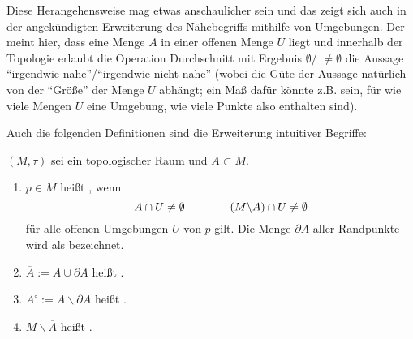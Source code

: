 \documentclass[../H_Analysis_main.tex]{subfiles}
\begin{document}
Diese Herangehensweise mag etwas anschaulicher sein und das zeigt sich auch in der angekündigten Erweiterung des Nähebegriffs mithilfe von Umgebungen. Der meint hier, dass eine Menge $A$ in einer offenen Menge $U$ liegt und innerhalb der Topologie erlaubt die Operation Durchschnitt mit Ergebnis $\emptyset$/ $\neq \emptyset$ die Aussage \enquote{irgendwie nahe}/\enquote{irgendwie nicht nahe} (wobei die Güte der Aussage natürlich von der \enquote{Größe} der Menge $U$ abhängt; ein Maß dafür könnte z.B. sein, für wie viele Mengen $U$ eine Umgebung, wie viele Punkte also enthalten sind).

Auch die folgenden Definitionen sind die Erweiterung intuitiver Begriffe:
\begin{defi}
$(M, \tau)$ sei ein topologischer Raum und $A \subset M$.

\begin{enumerate}
\item $p \in M$ heißt , wenn
\begin{equation*}
A \cap U \neq \emptyset \qquad \qquad \qty(M \backslash A) \cap U \neq \emptyset
\end{equation*}
für alle offenen Umgebungen $U$ von $p$ gilt. Die Menge $\partial A$ aller Randpunkte wird als  bezeichnet.

\item $\overline{A} := A \cup \partial A$ heißt .

\item $A^\circ := A \backslash \partial A$ heißt .

\item $M \backslash \overline{A}$ heißt .
\end{enumerate}
\end{defi}
\end{document}
